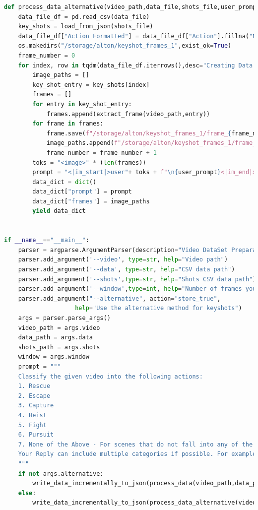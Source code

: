 \documentclass[12pt]{report}
\begin{document}
\begin{lstlisting}[language=Python, caption={Video DataSet Preparator Python Code}]
def process_data_alternative(video_path,data_file,shots_file,user_prompt="What is this?"):
    data_file_df = pd.read_csv(data_file)
    key_shots = load_from_json(shots_file)
    data_file_df["Action Formatted"] = data_file_df["Action"].fillna("No Action Found")
    os.makedirs("/storage/alton/keyshot_frames_1",exist_ok=True)
    frame_number = 0
    for index, row in tqdm(data_file_df.iterrows(),desc="Creating Data Set"):
        image_paths = []
        key_shot_entry = key_shots[index]
        frames = []
        for entry in key_shot_entry:
            frames.append(extract_frame(video_path,entry))
        for frame in frames:
            frame.save(f"/storage/alton/keyshot_frames_1/frame_{frame_number}.jpg")
            image_paths.append(f"/storage/alton/keyshot_frames_1/frame_{frame_number}.jpg")
            frame_number = frame_number + 1
        toks = "<image>" * (len(frames))
        prompt = "<|im_start|>user"+ toks + f"\n{user_prompt}<|im_end|><|im_start|>assistant "+row["Action Formatted"]+ "<|im_end|>"
        data_dict = dict()
        data_dict["prompt"] = prompt
        data_dict["frames"] = image_paths
        yield data_dict
    
    
if __name__=="__main__":
    parser = argparse.ArgumentParser(description="Video DataSet Preparator")
    parser.add_argument('--video', type=str, help="Video path")
    parser.add_argument('--data', type=str, help="CSV data path")
    parser.add_argument('--shots',type=str, help="Shots CSV data path")
    parser.add_argument('--window',type=int, help="Number of frames you wanna annotate")
    parser.add_argument("--alternative", action="store_true", 
                    help="Use the alternative method for keyshots")
    args = parser.parse_args()
    video_path = args.video
    data_path = args.data
    shots_path = args.shots
    window = args.window
    prompt = """
    Classify the given video into the following actions:
    1. Rescue
    2. Escape 
    3. Capture 
    4. Heist
    5. Fight
    6. Pursuit
    7. None of the Above - For scenes that do not fall into any of the aforementioned categories.
    Your Reply can include multiple categories if possible. For example, a scene can have Rescue and Escape.
    """
    if not args.alternative:
        write_data_incrementally_to_json(process_data(video_path,data_path,shots_path,window,prompt))
    else:
        write_data_incrementally_to_json(process_data_alternative(video_path,data_path,shots_path,prompt))
    
    
    
	\end{lstlisting}
\end{document}
